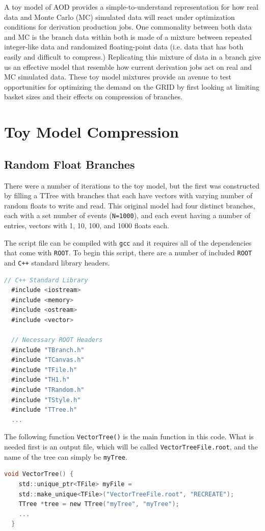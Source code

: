 A toy model of AOD provides a simple-to-understand representation for how real data and Monte Carlo (MC) simulated data will react under optimization conditions for derivation production jobs. 
One commonality between both data and MC is the branch data within both is made of a mixture between repeated integer-like data and randomized floating-point data (i.e. data that has both easily and difficult to compress.)
Replicating this mixture of data in a branch give us an effective model that resemble how current derivation jobs act on real and MC simulated data. 
These toy model mixtures provide an avenue to test opportunities for optimizing the demand on the GRID by first looking at limiting basket sizes and their effects on compression of branches. 


\section{Toy Model Compression}

\subsection{Random Float Branches} \label{sec:toy_compression_random_float_branches}
There were a number of iterations to the toy model, but the first was constructed by filling a TTree with branches that each have vectors with varying number of random floats to write and read.
This original model had four distinct branches, each with a set number of events (\verb|N=1000|), and each event having a number of entries, vectors with 1, 10, 100, and 1000 floats each.

The script file can be compiled with \verb|gcc| and it requires all of the dependencies that come with \verb|ROOT|. 
To begin this script, there are a number of included \verb|ROOT| and \verb|C++| standard library headers. 
\begin{lstlisting}[language=C]
  // C++ Standard Library
  #include <iostream>
  #include <memory>
  #include <ostream>
  #include <vector>
  
  // Necessary ROOT Headers
  #include "TBranch.h"
  #include "TCanvas.h"
  #include "TFile.h"
  #include "TH1.h"
  #include "TRandom.h"
  #include "TStyle.h"
  #include "TTree.h"
  ...
\end{lstlisting}


The following function \verb|VectorTree()| is the main function in this code.
What is needed first is an output file, which will be called \verb|VectorTreeFile.root|, and the name of the tree can simply be \verb|myTree|.
\begin{lstlisting}[language=C]
  void VectorTree() {
    std::unique_ptr<TFile> myFile =
    std::make_unique<TFile>("VectorTreeFile.root", "RECREATE");
    TTree *tree = new TTree("myTree", "myTree");
    ...
  }
\end{lstlisting}

